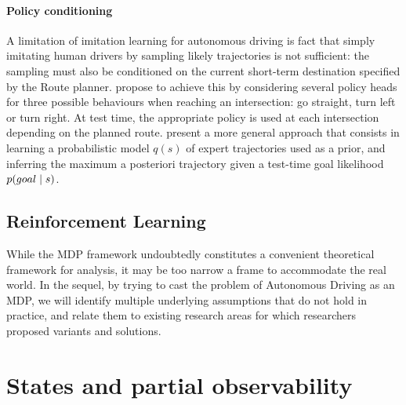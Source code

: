 \paragraph{Policy conditioning} A limitation of imitation learning for autonomous driving is fact that simply imitating human drivers by sampling likely trajectories is not sufficient: the sampling must also be conditioned on the current short-term destination specified by the Route planner. \citep{Codevilla2018} propose to achieve this by considering several policy heads for three possible behaviours when reaching an intersection: go straight, turn left or turn right. At test time, the appropriate policy is used at each intersection depending on the planned route. \citep{Rhinehart2020} present a more general approach that consists in learning a probabilistic model $q(s)$ of expert trajectories used as a prior, and inferring the maximum a posteriori trajectory given a test-time goal likelihood $p\lparen goal\mid s\rparen$.

\subsection{Reinforcement Learning}

While the \ac*{MDP} framework undoubtedly constitutes a convenient theoretical framework for analysis, it may be too narrow a frame to accommodate the real world. In the sequel, by trying to cast the problem of Autonomous Driving as an \ac*{MDP}, we will identify multiple underlying assumptions that do not hold in practice, and relate them to existing research areas for which researchers proposed variants and solutions.

\section{States and partial observability}
\label{sec:partial-observability}

